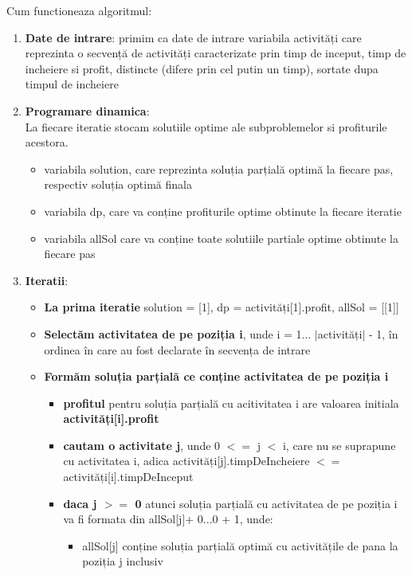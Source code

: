 Cum functioneaza algoritmul:
\begin{enumerate}
    \item \textbf{Date de intrare}: primim ca date de intrare variabila activități care reprezinta o secvență de activități caracterizate prin timp de inceput, timp de incheiere si profit,  distincte (difere prin cel putin un timp), sortate dupa timpul de incheiere
    \item \textbf{Programare dinamica}: \\
    La fiecare iteratie stocam solutiile optime ale subproblemelor si profiturile acestora.
    \begin{itemize}
        \item variabila solution, care reprezinta soluția parțială optimă la fiecare pas, respectiv soluția optimă finala 
        \item variabila dp, care va conține profiturile optime obtinute la fiecare iteratie
        \item  variabila allSol care va conține toate solutiile partiale optime obtinute la fiecare pas
    \end{itemize} 
    \item \textbf{Iteratii}: 
    \begin{itemize}
        \item \textbf{La prima iteratie} solution = [1], dp = activități[1].profit, allSol = [[1]] 
        \item \textbf{Selectăm activitatea de pe poziția i}, unde i = 1... $|$activități$|$ - 1, în ordinea în care au fost declarate în secvența de intrare
        \item \textbf{Formăm soluția parțială ce conține activitatea de pe poziția i}
        \begin{itemize}
            \item \textbf{profitul} pentru soluția parțială cu acitivitatea i are valoarea initiala \textbf{activități[i].profit}
            \item \textbf{cautam o activitate j}, unde 0 $<$$=$ j $<$ i, care nu se suprapune cu activitatea i, adica activități[j].timpDeIncheiere $<$$=$activități[i].timpDeInceput
            \item \textbf{daca j $>$$=$ 0} atunci soluția parțială cu activitatea de pe poziția i va fi formata din 
            allSol[j]+ 0...0 + 1, unde:
            \begin{itemize}
                \item allSol[j] conține soluția parțială optimă cu activitățile de pana la poziția j inclusiv

\end{itemize}
\end{itemize}
\end{itemize}
\end{enumerate}

